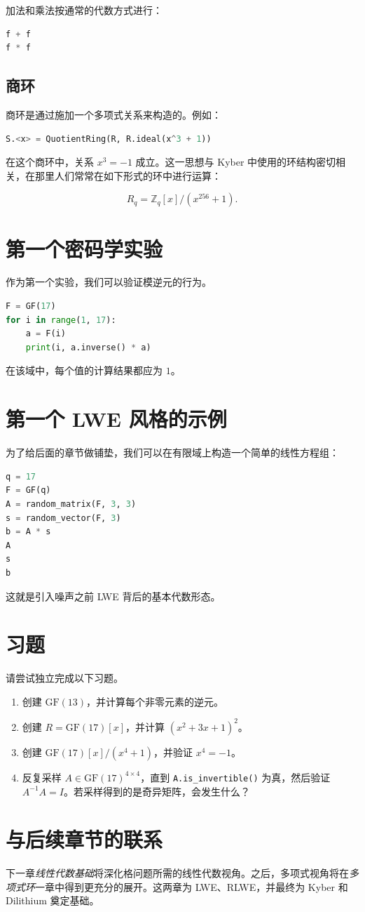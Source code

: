 加法和乘法按通常的代数方式进行：

\begin{lstlisting}[language=Python]
f + f
f * f
\end{lstlisting}

\subsection{商环}
商环是通过施加一个多项式关系来构造的。例如：

\begin{lstlisting}[language=Python]
S.<x> = QuotientRing(R, R.ideal(x^3 + 1))
\end{lstlisting}

在这个商环中，关系 $x^3 = -1$ 成立。这一思想与 Kyber 中使用的环结构密切相关，在那里人们常常在如下形式的环中进行运算：

\[
R_q = \mathbb{Z}_q[x]/(x^{256}+1).
\]

\section{第一个密码学实验}
作为第一个实验，我们可以验证模逆元的行为。

\begin{lstlisting}[language=Python]
F = GF(17)
for i in range(1, 17):
    a = F(i)
    print(i, a.inverse() * a)
\end{lstlisting}

在该域中，每个值的计算结果都应为 $1$。

\section{第一个 LWE 风格的示例}
为了给后面的章节做铺垫，我们可以在有限域上构造一个简单的线性方程组：

\begin{lstlisting}[language=Python]
q = 17
F = GF(q)
A = random_matrix(F, 3, 3)
s = random_vector(F, 3)
b = A * s
A
s
b
\end{lstlisting}

这就是引入噪声之前 LWE 背后的基本代数形态。

\section{习题}
请尝试独立完成以下习题。

\begin{enumerate}
  \item 创建 $\mathrm{GF}(13)$，并计算每个非零元素的逆元。
  \item 创建 $R = \mathrm{GF}(17)[x]$，并计算 $(x^2 + 3x + 1)^2$。
  \item 创建 $\mathrm{GF}(17)[x]/(x^4 + 1)$，并验证 $x^4 = -1$。
  \item 反复采样 $A \in \mathrm{GF}(17)^{4 \times 4}$，直到 \texttt{A.is\_invertible()} 为真，然后验证 $A^{-1}A = I$。若采样得到的是奇异矩阵，会发生什么？
\end{enumerate}

\section{与后续章节的联系}
下一章\emph{线性代数基础}将深化格问题所需的线性代数视角。之后，多项式视角将在\emph{多项式环}一章中得到更充分的展开。这两章为 LWE、RLWE，并最终为 Kyber 和 Dilithium 奠定基础。

\printbibliography[heading=chapterrefs]
